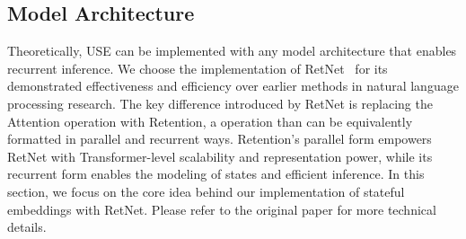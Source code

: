 \documentclass{article}
\begin{document}
\subsection{Model Architecture}
\label{subsec:method_architecture}
Theoretically, \textsc{USE} can be implemented with any model architecture that enables recurrent inference. 
We choose the implementation of RetNet~\citep{retnet} for its demonstrated effectiveness and efficiency over earlier methods in natural language processing research. The key difference introduced by RetNet is replacing the Attention operation with Retention, a operation than can be equivalently formatted in parallel and recurrent ways. Retention's parallel form empowers RetNet with Transformer-level scalability and representation power, while its recurrent form enables the modeling of states and efficient inference.
In this section, we focus on the core idea behind our implementation of stateful embeddings with RetNet. Please refer to the original paper \citet{retnet} for more technical details.

\end{document}
